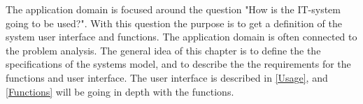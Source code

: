 The application domain is focused around the question "How is the IT-system going to be used?".
With this question the purpose is to get a definition of the system user interface and functions.
The application domain is often connected to the problem analysis. The general idea of this chapter is to define the the specifications of the systems model, and to describe the the requirements for the functions and user interface.
The user interface is described in \cref{Usage}, and \cref{Functions} will be going in depth with the functions.

